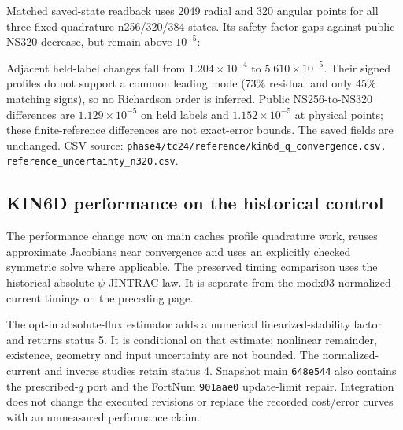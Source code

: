 \documentclass[10pt,a4paper]{article}
\newcommand{\dataref}[1]{{\footnotesize CSV source: \texttt{#1}}}
\begin{document}
Matched saved-state readback uses 2049 radial and 320 angular points for
all three fixed-quadrature n256/320/384 states. Its safety-factor gaps against
public NS320 decrease, but remain above $10^{-5}$:
\begin{center}\small

\end{center}
Adjacent held-label changes fall from $1.204\times10^{-4}$ to
$5.610\times10^{-5}$. Their signed profiles do not support a common leading
mode (73\% residual and only 45\% matching signs), so no Richardson order
is inferred. Public NS256-to-NS320 differences are $1.129\times10^{-5}$ on
held labels and $1.152\times10^{-5}$ at physical points; these finite-reference
differences are not exact-error bounds. The saved fields are unchanged.
\dataref{phase4/tc24/reference/kin6d\_q\_convergence.csv,
reference\_uncertainty\_n320.csv}.

\subsection*{KIN6D performance on the historical control}
The performance change now on main caches profile quadrature work, reuses
approximate Jacobians near convergence and uses an explicitly checked
symmetric solve where applicable. The preserved timing comparison uses the
historical absolute-$\psi$ JINTRAC law. It is separate from the modx03
normalized-current timings on the preceding page.

\begin{center}\small

\end{center}

The opt-in absolute-flux estimator adds a numerical linearized-stability
factor and returns status 5. It is conditional on that estimate; nonlinear
remainder, existence, geometry and input uncertainty are not bounded. The
normalized-current and inverse studies retain status 4. Snapshot main \texttt{648e544}
also contains the prescribed-$q$ port and the FortNum \texttt{901aae0} update-limit
repair. Integration does not change the executed revisions or replace the
recorded cost/error curves with an unmeasured performance claim.
\end{document}
